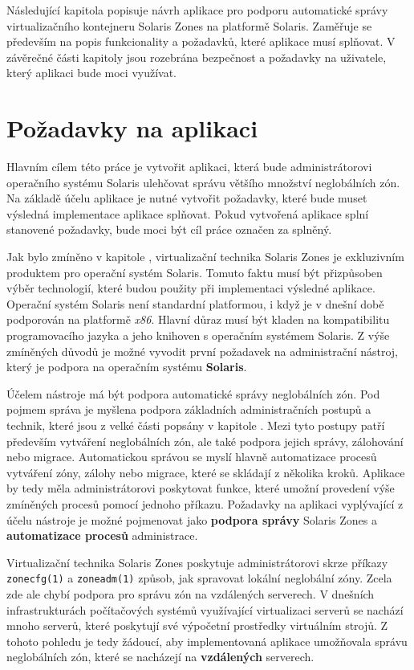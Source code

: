 \label{chapter:design}
Následující kapitola popisuje návrh aplikace pro podporu automatické správy virtualizačního kontejneru Solaris Zones na
platformě Solaris. Zaměřuje se především na popis funkcionality a požadavků, které aplikace musí splňovat. V závěrečné části
kapitoly jsou rozebrána bezpečnost a požadavky na uživatele, který aplikaci bude moci využívat.
\section{Požadavky na aplikaci}
\label{chapter:design:demands}
Hlavním cílem této práce je vytvořit aplikaci, která bude administrátorovi operačního systému Solaris ulehčovat správu
většího množství neglobálních zón. Na základě účelu aplikace je nutné vytvořit požadavky, které bude muset výsledná implementace
aplikace splňovat. Pokud vytvořená aplikace splní stanovené požadavky, bude moci být cíl práce označen za splněný.

Jak bylo zmíněno v kapitole \label{chapter:zones}, virtualizační technika Solaris Zones je exkluzivním produktem pro operační
systém Solaris. Tomuto faktu musí být přizpůsoben výběr technologií, které budou použity při implementaci výsledné aplikace.
Operační systém Solaris není standardní platformou, i když je v dnešní době podporován na platformě \textit{x86}. Hlavní důraz
musí být kladen na kompatibilitu programovacího jazyka a jeho knihoven s operačním systémem Solaris. Z výše zmíněných důvodů
je možné vyvodit první požadavek na administrační nástroj, který je podpora na operačním systému \textbf{Solaris}.

Účelem nástroje má být podpora automatické správy neglobálních zón. Pod pojmem správa je myšlena podpora základních administračních
postupů a technik, které jsou z velké části popsány v kapitole \label{chapter:zones}. Mezi tyto postupy patří především 
vytváření neglobálních zón, ale také podpora jejich správy, zálohování nebo migrace. Automatickou správou se myslí hlavně
automatizace procesů vytváření zóny, zálohy nebo migrace, které se skládají z několika kroků. Aplikace by tedy měla administrátorovi
poskytovat funkce, které umožní provedení výše zmíněných procesů pomocí jednoho příkazu. Požadavky na aplikaci vyplývající
z účelu nástroje je možné pojmenovat jako \textbf{podpora správy} Solaris Zones a \textbf{automatizace procesů} administrace.

Virtualizační technika Solaris Zones poskytuje administrátorovi skrze příkazy \verb|zonecfg(1)| a \verb|zoneadm(1)| způsob,
jak spravovat lokální neglobální zóny. Zcela zde ale chybí podpora pro správu zón na vzdálených serverech. V dnešních infrastrukturách
počítačových systémů využívající virtualizaci serverů se nachází mnoho serverů, které poskytují své výpočetní prostředky
virtuálním strojů. Z tohoto pohledu je tedy žádoucí, aby implementovaná aplikace umožňovala správu neglobálních zón, které
se nacházejí na \textbf{vzdálených} serverech.


